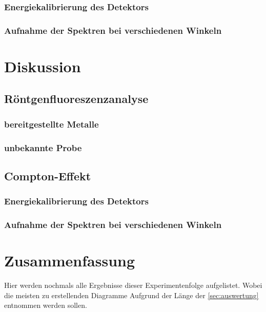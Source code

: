 \documentclass[12pt,english,ngerman]{scrartcl}
\begin{document}
\subsubsection{Energiekalibrierung des Detektors}

\subsubsection{Aufnahme der Spektren bei verschiedenen Winkeln}



\section{Diskussion}\label{sec:diskussion}

\subsection{Röntgenfluoreszenzanalyse}

\subsubsection{bereitgestellte Metalle}


\subsubsection{unbekannte Probe}


\subsection{Compton-Effekt}

\subsubsection{Energiekalibrierung des Detektors}

\subsubsection{Aufnahme der Spektren bei verschiedenen Winkeln}



\section{Zusammenfassung}\label{sec:zusammenfassung}

Hier werden nochmals alle Ergebnisse dieser Experimentenfolge aufgelistet.
Wobei die meisten zu erstellenden Diagramme Aufgrund der Länge der
\autoref{sec:auswertung} entnommen werden sollen.
\end{document}
